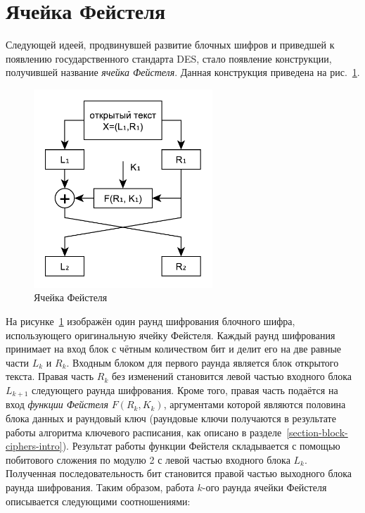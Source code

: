 \section{Ячейка Фейстеля}

Следующей идеей, продвинувшей развитие блочных шифров и приведшей к появлению государственного стандарта DES, стало появление конструкции, получившей название \emph{ячейка Фейстеля}. Данная конструкция приведена на рис.~\ref{fig:Feistel}.

\begin{figure}[!htb]
    \centering
    \includegraphics[width=0.6\textwidth]{pic/feistel}
    \caption{Ячейка Фейстеля\label{fig:Feistel}}
\end{figure}

На рисунке~\ref{fig:Feistel} изображён один раунд шифрования блочного шифра, использующего оригинальную ячейку Фейстеля. Каждый раунд шифрования принимает на вход блок с чётным количеством бит и делит его на две равные части $L_k$ и $R_k$. Входным блоком для первого раунда является блок открытого текста. Правая часть $R_k$ без изменений становится левой частью входного блока $L_{k+1}$ следующего раунда шифрования. Кроме того, правая часть подаётся на вход \emph{функции Фейстеля} $F\left(R_k, K_k \right)$, аргументами которой являются половина блока данных и раундовый ключ (раундовые ключи получаются в результате работы алгоритма ключевого расписания, как описано в разделе~\ref{section-block-ciphers-intro}). Результат работы функции Фейстеля складывается с помощью побитового сложения по модулю 2 с левой частью входного блока $L_k$. Полученная последовательность бит становится правой частью выходного блока раунда шифрования. Таким образом, работа $k$-ого раунда ячейки Фейстеля описывается следующими соотношениями:

